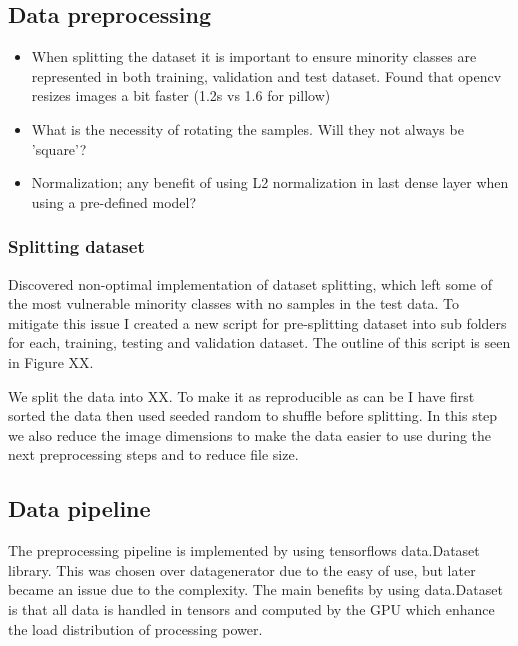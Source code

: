 \documentclass[thesis.tex]{subfiles}
\begin{document}
\subsection{Data preprocessing}
\begin{itemize}
\item When splitting the dataset it is important to ensure minority classes are represented in both training, validation and test dataset. Found that opencv resizes images a bit faster (1.2s vs 1.6 for pillow)
\item What is the necessity of rotating the samples. Will they not always be 'square'?
\item Normalization; any benefit of using L2 normalization in last dense layer when using a pre-defined model?
\end{itemize}

\subsubsection{Splitting dataset}
Discovered non-optimal implementation of dataset splitting, which left some of the most vulnerable minority classes with no samples in the test data. To mitigate this issue I created a new script for pre-splitting dataset into sub folders for each, training, testing and validation dataset. The outline of this script is seen in Figure XX.


We split the data into XX. To make it as reproducible as can be I have first sorted the data then used seeded random to shuffle before splitting. %
In this step we also reduce the image dimensions to make the data easier to use during the next preprocessing steps and to reduce file size.



\subsection{Data pipeline}
The preprocessing pipeline is implemented by using tensorflows data.Dataset library. This was chosen over datagenerator due to the easy of use, but later became an issue due to the complexity. The main benefits by using data.Dataset is that all data is handled in tensors and computed by the GPU which enhance the load distribution of processing power. 
\end{document}
